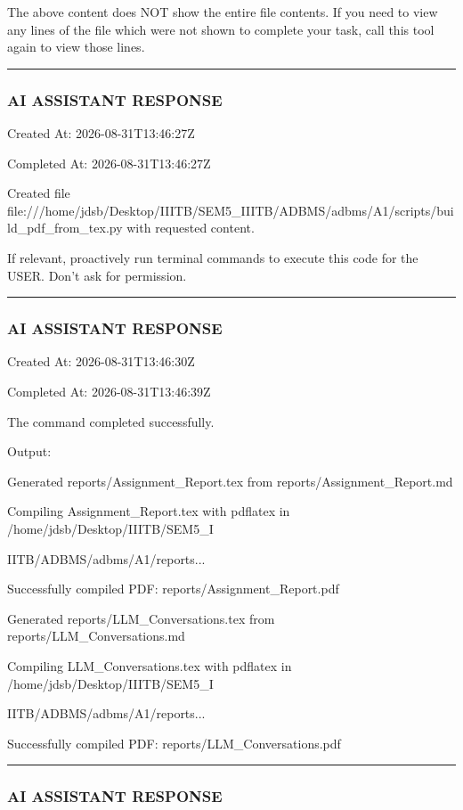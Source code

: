 \documentclass[11pt,a4paper]{article}
\begin{document}
{{{The above content does NOT show the entire file contents. If you need to view any lines of the file which were not shown to complete your task, call this tool again to view those lines.


\hrule

\subsubsection{AI ASSISTANT RESPONSE}

Created At: 2026-08-31T13:46:27Z

Completed At: 2026-08-31T13:46:27Z

Created file file:///home/jdsb/Desktop/IIITB/SEM5\_IIITB/ADBMS/adbms/A1/scripts/build\_pdf\_from\_tex.py with requested content.

If relevant, proactively run terminal commands to execute this code for the USER. Don't ask for permission.


\hrule

\subsubsection{AI ASSISTANT RESPONSE}

Created At: 2026-08-31T13:46:30Z

Completed At: 2026-08-31T13:46:39Z


The command completed successfully.

Output:

Generated reports/Assignment\_Report.tex from reports/Assignment\_Report.md

Compiling Assignment\_Report.tex with pdflatex in /home/jdsb/Desktop/IIITB/SEM5\_I

IITB/ADBMS/adbms/A1/reports...

Successfully compiled PDF: reports/Assignment\_Report.pdf

Generated reports/LLM\_Conversations.tex from reports/LLM\_Conversations.md

Compiling LLM\_Conversations.tex with pdflatex in /home/jdsb/Desktop/IIITB/SEM5\_I

IITB/ADBMS/adbms/A1/reports...

Successfully compiled PDF: reports/LLM\_Conversations.pdf


\hrule

\subsubsection{AI ASSISTANT RESPONSE}

}}}
\end{document}
